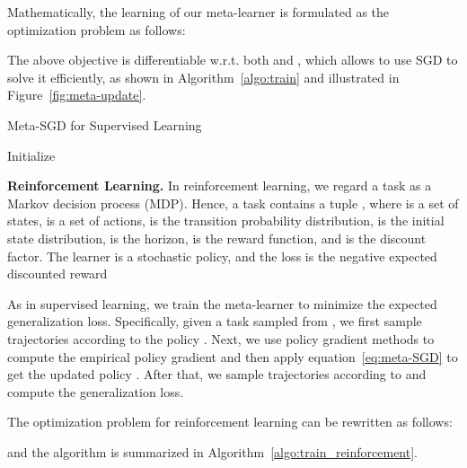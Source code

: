 \documentclass{article}
\begin{document}
Mathematically, the learning of our meta-learner is formulated as the optimization problem as follows:


The above objective is differentiable w.r.t. both  and , which allows to use SGD to solve it efficiently, as shown in Algorithm~\ref{algo:train} and illustrated in Figure~\ref{fig:meta-update}.







\IncMargin{1.5em}
\begin{algorithm}[h]
	\caption{\small Meta-SGD for Supervised Learning}
	\label{algo:train}
	\SetAlgoNoLine
	
	\Indm
	\KwOut{
	}

	\Indp
	Initialize \;
	
\end{algorithm}

\textbf{Reinforcement Learning.}
In reinforcement learning, we regard a task as a Markov decision process (MDP). Hence, a task  contains a tuple , where  is a set of states,  is a set of actions,  is the transition probability distribution,  is the initial state distribution,  is the horizon,  is the reward function, and  is the discount factor. The learner  is a stochastic policy, and the loss  is the negative expected discounted reward

As in supervised learning, we train the meta-learner to minimize the expected generalization loss. Specifically, given a task  sampled from , we first sample  trajectories according to the policy . Next, we use policy gradient methods to compute the empirical policy gradient  and then apply equation~\ref{eq:meta-SGD} to get the updated policy . After that, we sample  trajectories according to  and compute the generalization loss.

The optimization problem for reinforcement learning can be rewritten as follows:

and the algorithm is summarized in Algorithm~\ref{algo:train_reinforcement}.
\end{document}
